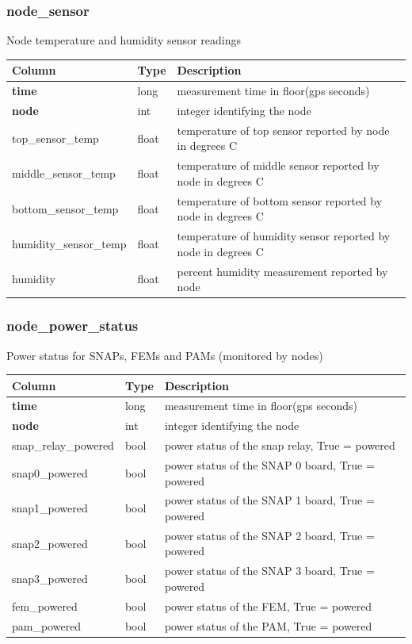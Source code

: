 \documentclass{article}
\begin{document}
{\subsubsection{node\_sensor}
Node temperature and humidity sensor readings
\begin{center}
 \begin{tabular}{| p{4cm} | p{2cm} | p{10cm} |}
\hline
 {\bf Column} & {\bf Type}  & {\bf Description} \\ [0.5ex]  \hline\hline
\textbf{time} & long & measurement time in floor(gps seconds)\\ \hline
\textbf{node} & int & integer identifying the node \\ \hline
top\_sensor\_temp & float & temperature of top sensor reported by node in degrees C \\\hline
middle\_sensor\_temp & float & temperature of middle sensor reported by node in degrees C \\\hline
bottom\_sensor\_temp & float & temperature of bottom sensor reported by node in degrees C \\\hline
humidity\_sensor\_temp & float & temperature of humidity sensor reported by node in degrees C \\\hline
humidity & float & percent humidity measurement reported by node\\\hline
\end{tabular}
\end{center}

\subsubsection{node\_power\_status}
Power status for SNAPs, FEMs and PAMs (monitored by nodes)
\begin{center}
 \begin{tabular}{| p{4cm} | p{2cm} | p{10cm} |}
\hline
 {\bf Column} & {\bf Type}  & {\bf Description} \\ [0.5ex]  \hline\hline
\textbf{time} & long & measurement time in floor(gps seconds)\\ \hline
\textbf{node} & int & integer identifying the node \\ \hline
snap\_relay\_powered & bool & power status of the snap relay, True = powered \\\hline
snap0\_powered & bool & power status of the SNAP 0 board, True = powered \\\hline
snap1\_powered & bool & power status of the SNAP 1 board, True = powered \\\hline
snap2\_powered & bool & power status of the SNAP 2 board, True = powered \\\hline
snap3\_powered & bool & power status of the SNAP 3 board, True = powered \\\hline
fem\_powered & bool & power status of the FEM, True = powered \\\hline
pam\_powered & bool & power status of the PAM, True = powered \\\hline
\end{tabular}
\end{center}

}
\end{document}
